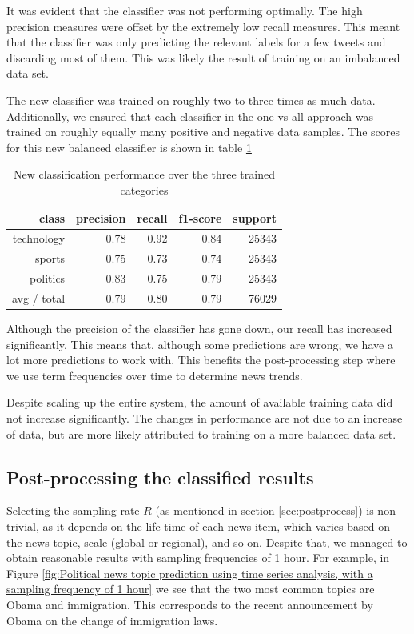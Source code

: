 \documentclass{llncs}
\begin{document}
It was evident that the classifier was not performing optimally. The high precision measures were offset by the extremely low recall measures. This meant that the classifier was only predicting the relevant labels for a few tweets and discarding most of them. This was likely the result of training on an imbalanced data set.

The new classifier was trained on roughly two to three times as much data. Additionally, we ensured that each classifier in the one-vs-all approach was trained on roughly equally many positive and negative data samples. The scores for this new balanced classifier is shown in table \ref{tbl:newclassifier}

\begin{table}
	\begin{center}
		\begin{tabular}{|r|r|r|r|r|} \hline
			class  & precision   & recall & f1-score  & support \\ \hline
			technology    &   0.78 &     0.92  &    0.84   &  25343 \\
			sports   &    0.75   &   0.73   &   0.74   &   25343 \\
			politics   &    0.83  &    0.75   &   0.79   &   25343 \\
			avg / total  &     0.79   &   0.80  &    0.79   &  76029 \\ \hline
		\end{tabular}
	\end{center}
	\caption{New classification performance over the three trained categories}
	\label{tbl:newclassifier}
\end{table}

Although the precision of the classifier has gone down, our recall has increased significantly. This means that, although some predictions are wrong, we have a lot more predictions to work with. This benefits the post-processing step where we use term frequencies over time to determine news trends.

Despite scaling up the entire system, the amount of available training data did not increase significantly. The changes in performance are not due to an increase of data, but are more likely attributed to training on a more balanced data set.

\subsection {Post-processing the classified results}
Selecting the sampling rate $R$ (as mentioned in section \ref{sec:postprocess}) is non-trivial, as it depends on the life time of each news item, which varies based on the news topic, scale (global or regional), and so on. Despite that, we managed to obtain reasonable results with sampling frequencies of 1 hour. For example, in Figure \ref{fig:Political news topic prediction using time series analysis, with a sampling frequency of 1 hour} we see that the two most common topics are Obama and immigration. This corresponds to the recent announcement by Obama on the change of immigration laws.
\end{document}
